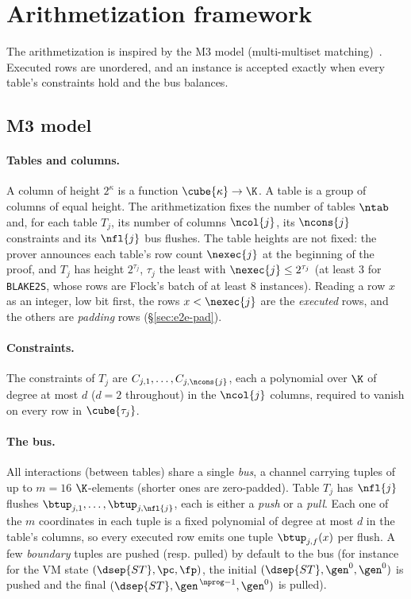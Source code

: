 \section{Arithmetization framework}\label{sec:arith}

The arithmetization is inspired by the M3 model (multi-multiset matching)~\cite{m3}. Executed rows are unordered, and an instance is accepted exactly when every table's constraints hold and the bus balances.

\subsection{M3 model}\label{sec:m3}

\paragraph{Tables and columns.} A column of height $2^{\kappa}$ is a function $\cube{\kappa}\to\K$. A table is a group of columns of equal height. The arithmetization fixes the number of tables $\ntab$ and, for each table $T_j$, its number of columns $\ncol{j}$, its $\ncons{j}$ constraints and its $\nfl{j}$ bus flushes. The table heights are not fixed: the prover announces each table's row count $\nexec{j}$ at the beginning of the proof, and $T_j$ has height $2^{\tau_j}$, $\tau_j$ the least with $\nexec{j}\le2^{\tau_j}$ (at least $3$ for \texttt{BLAKE2S}, whose rows are Flock's batch of at least $8$ instances). Reading a row $x$ as an integer, low bit first, the rows $x<\nexec{j}$ are the \emph{executed} rows, and the others are \emph{padding} rows (\S\ref{sec:e2e-pad}).

\paragraph{Constraints.} The constraints of $T_j$ are $C_{j,1},\dots,C_{j,\ncons{j}}$, each a polynomial over $\K$ of degree at most $d$ ($d=2$ throughout) in the $\ncol{j}$ columns, required to vanish on every row in $\cube{\tau_j}$.

\paragraph{The bus.} All interactions (between tables) share a single \emph{bus}, a channel carrying tuples of up to $m=16$ $\K$-elements (shorter ones are zero-padded). Table $T_j$ has $\nfl{j}$ flushes $\btup_{j,1},\dots,\btup_{j,\nfl{j}}$, each is either a \emph{push} or a \emph{pull}. Each one of the $m$ coordinates in each tuple is a fixed polynomial of degree at most $d$ in the table's columns, so every executed row emits one tuple $\btup_{j,f}(x)$ per flush. A few \emph{boundary} tuples are pushed (resp. pulled) by default to the bus (for instance for the VM state $(\dsep{ST}, \pc, \fp)$, the initial $(\dsep{ST}, \gen^0, \gen^0)$ is pushed and the final $(\dsep{ST}, \gen^{\,\nprog-1}, \gen^{0})$ is pulled).

